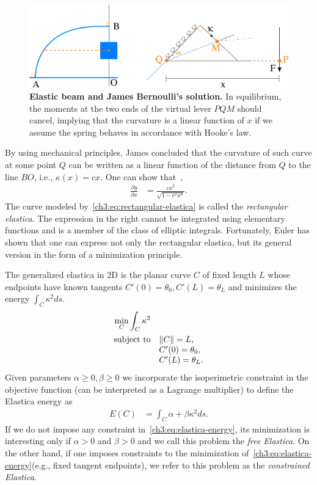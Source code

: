 \begin{figure}
\center
\includegraphics[scale=0.36]{figures/chapter3/elastica/james-scheme.png}
\caption{\textbf{Elastic beam and James Bernoulli's solution.} In equilibrium, the moments at the two ends of the virtual lever $PQM$ should cancel, implying that the curvature is a linear function of $x$ if we assume the spring behaves in accordance with Hooke's law.}
\label{ch3:fig:james-scheme-elastica}
\end{figure}

By using mechanical principles, James concluded that the curvature of such curve at some point $Q$ can be written as a linear function of the distance from $Q$ to the line $BO$, i.e., $\kappa(x) = cx$. One can show that~\cite{levien08elastica,truesdell60rational},
\begin{align}
	\frac{\partial y}{\partial x} &= \frac{cx^2}{ \sqrt{1-c^2x^4} }.
	\label{ch3:eq:rectangular-elastica}
\end{align}
%
The curve modeled by~\cref{ch3:eq:rectangular-elastica} is called the \emph{rectangular elastica}. The expression in the right cannot be integrated using elementary functions and is a member of the class of elliptic integrals. Fortunately, Euler has shown that one can express not only the rectangular elastica, but its general version in the form of a minimization principle. 

The generalized elastica in $2$D is the planar curve $C$ of fixed length $L$ whose endpoints have known tangents $C'(0)=\theta_0,C'(L)=\theta_L$ and minimizes the energy $\int_{C} \kappa^2 ds$.
\begin{align*}
	\begin{array}{rl}
		\displaystyle \min_{C} \int_{C}{\kappa ^2} \\[1em]
		\text{subject to}& \lVert C\rVert = L,\\
		& C'(0) = \theta_0, \\
		& C'(L) = \theta_L.
	\end{array}	
\end{align*}
%
Given parameters $\alpha \geq 0, \beta \geq 0$ we incorporate the isoperimetric constraint in the objective function (can be interpreted as a Lagrange multiplier) to define the Elastica energy as
\begin{align}
	E(C) &= \int_{C}{\alpha + \beta \kappa^2 ds}.
	\label{ch3:eq:elastica-energy}
\end{align}
%
If we do not impose any constraint in~\cref{ch3:eq:elastica-energy}, its minimization is interesting only if $\alpha >0$ and $\beta >0$ and we call this problem the \emph{free Elastica}. On the other hand, if one imposes constraints to the minimization of~\cref{ch3:eq:elastica-energy}(e.g., fixed tangent endpoints), we refer to this problem as the \emph{constrained Elastica}.

